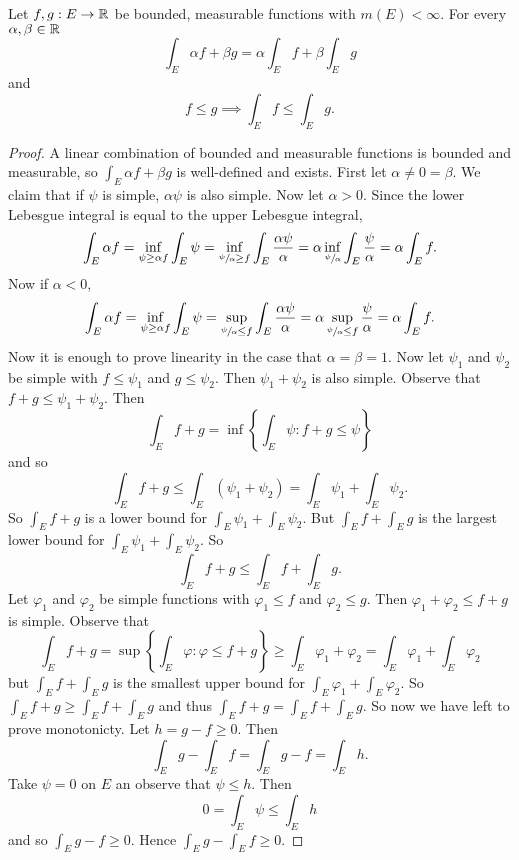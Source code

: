 \begin{theorem}
	Let $f, g : E \to \mathbb{R}$ be bounded, measurable functions with $m(E) < \infty$.
	For every $\alpha, \beta \in \mathbb{R}$
	\[
		\int_E \alpha f + \beta g = \alpha \int_E f + \beta \int_E g
	\]
	and
	\[
		f \leq g \implies \int_E f \leq \int_E g.
	\]
\end{theorem}

\begin{proof}
	A linear combination of bounded and measurable functions is bounded and
	measurable,
	so $\int_E \alpha f + \beta g$ is well-defined and exists.
	First let $\alpha \neq 0 = \beta$.
	We claim that if $\psi$ is simple, $\alpha \psi$ is also simple.
	Now let $\alpha > 0$.
	Since the lower Lebesgue integral is equal to the upper Lebesgue integral,
	\[
		\int_E \alpha f
		= \inf_{\psi \geq \alpha f} \int_E \psi
		= \inf_{\sfrac{\psi}{\alpha} \geq f}\int_E\frac{\alpha \psi}{\alpha}
		= \alpha \inf_{\sfrac{\psi}{\alpha}} \int_E \frac{\psi}{\alpha}
		= \alpha \int_E f.
	\]
	Now if $\alpha < 0$,
	\[
		\int_E \alpha f
		= \inf_{\psi \geq \alpha f} \int_E \psi
		= \sup_{\sfrac{\psi}{\alpha} \leq f} \int_E \frac{\alpha \psi}{\alpha}
		= \alpha \sup_{\sfrac{\psi}{\alpha} \leq f} \frac{\psi}{\alpha}
		= \alpha \int_E f.
	\]
	Now it is enough to prove linearity in the case that $\alpha = \beta = 1$.
	Now let $\psi_1$ and $\psi_2$ be simple with $f \leq \psi_1$ and
	$g \leq \psi_2$.
	Then $\psi_1 + \psi_2$ is also simple.
	Observe that $f + g \leq \psi_1 + \psi_2$.
	Then
	\[
		\int_E f + g
		= \inf\left\{
			\int_E \psi: f + g \leq \psi
		\right\}
	\]
	and so
	\[
		\int_E f + g
		\leq \int_E(\psi_1 + \psi_2)
		= \int_E \psi_1 + \int_E \psi_2.
	\]
	So $\int_E f + g$ is a lower bound for
	$\int_E \psi_1 + \int_E \psi_2$.
	But $\int_E f + \int_E g$ is the largest lower bound for
	$\int_E \psi_1 + \int_E \psi_2$.
	So
	\[
		\int_E f + g \leq \int_E f + \int_E g.
	\]
	Let $\varphi_1$ and $\varphi_2$ be simple functions with
	$\varphi_1 \leq f$ and $\varphi_2 \leq g$.
	Then $\varphi_1 + \varphi_2 \leq f + g$ is simple.
	Observe that
	\[
		\int_E f + g
		= \sup\left\{
			\int_E \varphi: \varphi \leq f + g
		\right\}
		\geq \int_E \varphi_1 + \varphi_2
		= \int_E \varphi_1 + \int_E \varphi_2
	\]
	but $\int_E f + \int_E g$ is the smallest upper bound for
	$\int_E \varphi_1 + \int_E \varphi_2$.
	So $\int_E f + g \geq \int_E f + \int_E g$ and thus
	$\int_E f + g = \int_E f + \int_E g$.
	So now we have left to prove monotonicty.
	Let $h = g - f \geq 0$.
	Then
	\[
		\int_E g - \int_E f = \int_E g - f = \int_E h.
	\]
	Take $\psi = 0$ on $E$ an observe that $\psi \leq h$.
	Then
	\[
		0 = \int_E \psi \leq \int_E h
	\]
	and so $\int_E g - f \geq 0$.
	Hence $\int_E g - \int_E f \geq 0$.
\end{proof}

